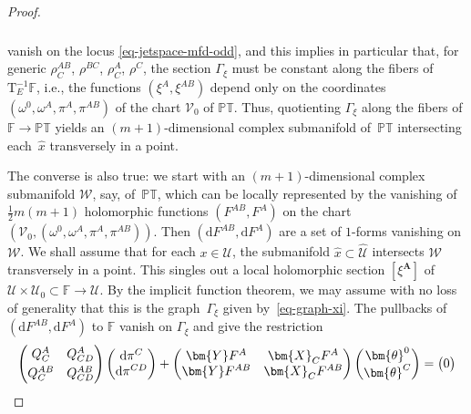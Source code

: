 \documentclass[pdftex]{sigma}
\numberwithin{equation}{section}
\newcommand{\mbf} [1]{\mathbf{#1}}
\newcommand{\mc} [1]{\mathcal{#1}}
\newcommand{\dd} {\mathrm{d}}
\newcommand{\Tgt} {\mathrm{T}}
\newcommand{\PT} {\mathbb{PT}}
\newcommand{\F} {\mathbb{F}}
\begin{document}
\begin{proof}
\begin{gather}
\begin{split}
\end{split}\label{eq-contact-odd}
\end{gather}
vanish on the locus \eqref{eq-jetspace-mfd-odd}, and this implies in particular that, for generic $\rho_{C}^{AB}$, $\rho^{BC}$, $\rho_{C}^{A}$, $\rho^{C}$, the section $\Gamma_\xi$ must be constant along the f\/ibers of $\Tgt^{-1}_E \F$, i.e., the functions $(\xi^A,\xi^{AB})$ depend only on the coordinates $(\omega^0, \omega^A,\pi^A,\pi^{AB})$ of the chart $\mc{V}_0$ of $\PT$. Thus, quotienting $\Gamma_\xi$ along the f\/ibers of $\F \rightarrow \PT$ yields an $(m+1)$-dimensional complex submanifold of~$\PT$ intersecting each~$\hat{x}$ transversely in a point.

The converse is also true: we start with an $(m+1)$-dimensional complex submanifold $\mc{W}$, say, of~$\PT$, which can be locally represented by the vanishing of $\frac{1}{2}m(m+1)$ holomorphic functions $(F^{AB} , F^{A})$ on the chart $(\mc{V}_0, (\omega^0, \omega^A,\pi^A,\pi^{AB}))$. Then $(\dd F^{AB} , \dd F^{A})$ are a set of $1$-forms vanishing on $\mc{W}$. We shall assume that for each $x \in \mc{U}$, the submanifold $\hat{x} \subset \widehat{\mc{U}}$ intersects $\mc{W}$ transversely in a point. This singles out a local holomorphic section $[\xi^{\mbf{A}}]$ of $\mc{U} \times \mc{U}_0 \subset \F \rightarrow \mc{U}$. By the implicit function theorem, we may assume with no loss of generality that this is the graph~$\Gamma_\xi$ given by~\eqref{eq-graph-xi}. The pullbacks of $(\dd F^{AB} , \dd F^{A})$ to $\F$ vanish on $\Gamma_\xi$ and give the restriction
\begin{gather}\label{eq-pullbackF}
\begin{pmatrix}
Q_C^A & Q_{CD}^A \vspace{1mm}\\
Q_C^{AB} & Q_{CD}^{AB}
\end{pmatrix}
\begin{pmatrix}
\dd \pi^{C} \\
\dd \pi^{CD}
\end{pmatrix}
+
\begin{pmatrix}
\bm{Y} F^{A} & \bm{X}_C F^{A} \\
\bm{Y} F^{AB} & \bm{X}_C F^{AB}
\end{pmatrix}
\begin{pmatrix}
\bm{\theta}^0 \\
\bm{\theta}^C
\end{pmatrix} =
\begin{pmatrix}
0 \\

\end{pmatrix}
\end{gather}
\end{proof}
\end{document}
